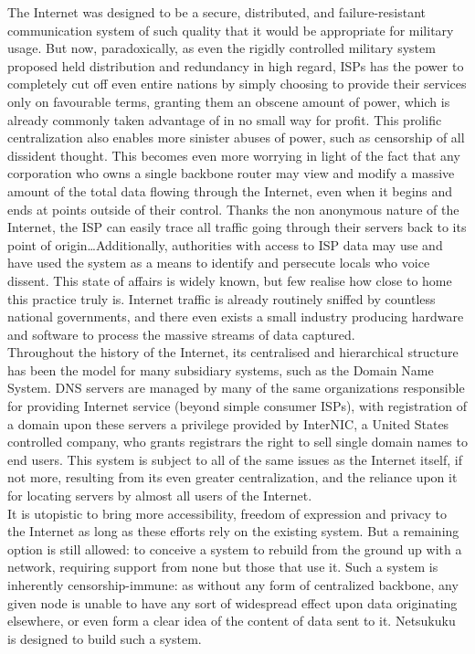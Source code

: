 \documentclass[a4paper]{article}
\begin{document}
The Internet was designed to be a secure, distributed, and failure-resistant
communication system of such quality that it would be appropriate for military
usage. But now, paradoxically, as even the rigidly controlled military system
proposed held distribution and redundancy in high regard, ISPs has the power
to completely cut off even entire nations by simply choosing to provide
their services only on favourable terms\cite{digitaldivide}, granting
them an obscene amount of power, which is already commonly taken
advantage of in no small way for profit. This prolific centralization
also enables more sinister abuses of power, such as censorship of all
dissident thought.
This becomes even more worrying in light of the fact that any corporation who
owns a single backbone router may view and modify a massive amount of the
total data flowing through the Internet, even when it begins and ends at 
points outside of their control. Thanks the non anonymous nature of the 
Internet, the ISP can easily trace all traffic going through their servers
back to its point of origin\dots Additionally, authorities with access 
to ISP data may use and have used the system as a means to identify and 
persecute locals who voice dissent\cite{ipdindymedia}.
This state of affairs is widely known, but few realise how close to home
this practice truly is. Internet traffic is already routinely sniffed by
countless national governments, and there even exists a small industry
producing hardware and software to process the massive streams of data
captured.\\

Throughout the history of the Internet, its centralised and hierarchical 
structure has been the model for many subsidiary systems, such as the
Domain Name System. DNS servers are managed by many of the same organizations
responsible for providing Internet service (beyond simple consumer ISPs), with 
registration of a domain upon these servers a privilege provided by InterNIC, 
a United States controlled company, who grants registrars the right to sell 
single domain names to end users.  This system is subject to all of the same 
issues as the Internet itself, if not more, resulting from its even greater
centralization, and the reliance upon it for locating servers by almost all
users of the Internet.\\

It is utopistic to bring more accessibility, freedom of expression and
privacy to the Internet as long as these efforts rely on the existing
system. But a remaining option is still allowed: to conceive a system to
rebuild from the ground up with a network, requiring support from none
but those that use it. Such a system is inherently censorship-immune:
as without any form of centralized backbone,  any given node is unable
to have any sort of widespread effect upon data originating elsewhere,
or even form a clear idea of the content of data sent to it. Netsukuku
is designed to build such a system.
\end{document}
